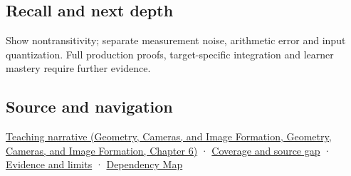 \subsection{Recall and next depth}\label{appendix-b5b83329215b-recall-and-next-depth}

Show nontransitivity; separate measurement noise, arithmetic error and input quantization. Full production proofs, target-specific integration and learner mastery require further evidence.

\subsection{Source and navigation}\label{appendix-b5b83329215b-source-and-navigation}

\href{../03-Geometry-Cameras-and-Image-Formation/main.pdf\#nameddest=02-foundations-ii-ch037-reliability-begins-at-the-boundary-of-the-calculation}{Teaching narrative (Geometry, Cameras, and Image Formation, Geometry, Cameras, and Image Formation, Chapter 6)} · \hyperref[appendix-fd090d982a15-phase-6---parts-501-600]{Coverage and source gap} · \hyperref[appendix-a103e7846d21-phase-6---source-analysis-and-verification]{Evidence and limits} · \hyperref[appendix-4ad47bdd269a]{Dependency Map}
